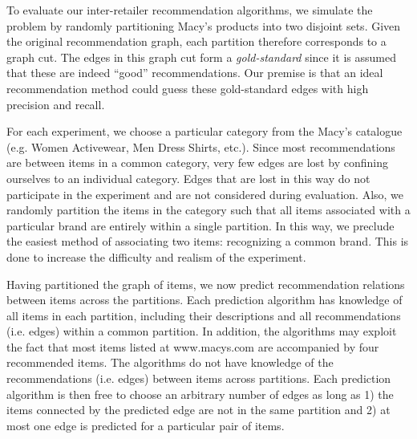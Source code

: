 \documentclass[11pt]{article}
\begin{document}
To evaluate our inter-retailer recommendation algorithms, we simulate the
problem by randomly partitioning Macy's products into two disjoint sets. Given
the original recommendation graph, each partition therefore corresponds to a
graph cut. The edges in this graph cut form a {\em gold-standard} since it is
assumed that these are indeed ``good'' recommendations. Our premise is that an
ideal recommendation method could guess these gold-standard edges with high
precision and recall.

For each experiment, we choose a particular category from the Macy's catalogue
(e.g. Women Activewear, Men Dress Shirts, etc.). Since most recommendations are
between items in a common category, very few edges are lost by confining
ourselves to an individual category. Edges that are lost in this way do not
participate in the experiment and are not considered during evaluation.  Also,
we randomly partition the items in the category such that all items associated
with a particular brand are entirely within a single partition. In this way, we
preclude the easiest method of associating two items: recognizing a common
brand. This is done to increase the difficulty and realism of the experiment.

Having partitioned the graph of items, we now predict recommendation relations
between items across the partitions. Each prediction algorithm has knowledge of
all items in each partition, including their descriptions and all
recommendations (i.e.  edges) within a common partition. In addition,
the algorithms may exploit the fact that most items listed at www.macys.com are
accompanied by four recommended items. The algorithms do not have knowledge of
the recommendations (i.e. edges) between items across partitions. Each
prediction algorithm is then free to choose an arbitrary number of edges as long
as 1) the items connected by the predicted edge are not in the same partition
and 2) at most one edge is predicted for a particular pair of items.
\end{document}
